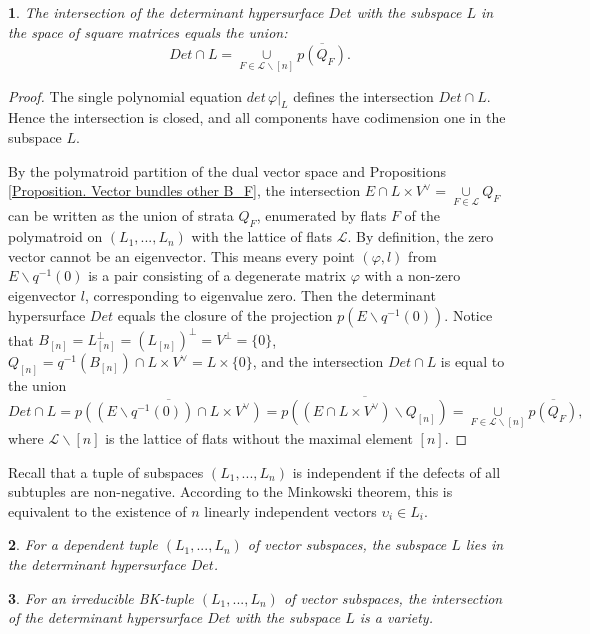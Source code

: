 \documentclass[11pt]{article}
\theoremstyle{plain}
\newtheorem{thm}{\protect\theoremname}[section]
\theoremstyle{definition}
\theoremstyle{remark}
\theoremstyle{plain}
\theoremstyle{plain}
\newtheorem{prop}[thm]{\protect\propositionname}
\theoremstyle{plain}
\newtheorem{cor}[thm]{\protect\corollaryname}
\theoremstyle{definition}
\providecommand{\corollaryname}{Corollary}
\providecommand{\propositionname}{Proposition}
\providecommand{\theoremname}{Theorem}
\begin{document}
\begin{prop}
The intersection of the determinant hypersurface $Det$ with the subspace
$L$ in the space of square matrices equals the union:
\[
Det\cap L=\underset{F\in\mathcal{L}\backslash[n]}{\cup}\overline{p(Q_{F})}.
\]
\end{prop}

\begin{proof}
The single polynomial equation $det\,\varphi|_{L}$ defines the intersection
$Det\cap L$. Hence the intersection is closed, and all components
have codimension one in the subspace $L$.

By the polymatroid partition of the dual vector space \cite{pokidkin_combinatorics_2025}
and Propositions \ref{Proposition. Vector bundles other B_F}, the
intersection $E\cap L\times V^{\lor}=\underset{F\in\mathcal{L}}{\cup}Q_{F}$
can be written as the union of strata $Q_{F}$, enumerated by flats
$F$ of the polymatroid on $(L_{1},...,L_{n})$ with the lattice of
flats $\mathcal{L}$. By definition, the zero vector cannot be an
eigenvector. This means every point $(\varphi,l)$ from $E\backslash q^{-1}(0)$
is a pair consisting of a degenerate matrix $\varphi$ with a non-zero
eigenvector $l$, corresponding to eigenvalue zero. Then the determinant
hypersurface $Det$ equals the closure of the projection $p(E\backslash q^{-1}(0))$.
Notice that $B_{[n]}=L_{[n]}^{\perp}=(L_{[n]})^{\perp}=V^{\perp}=\{0\}$,
$Q_{[n]}=q^{-1}(B_{[n]})\cap L\times V^{\lor}=L\times\{0\}$, and
the intersection $Det\cap L$ is equal to the union
\[
Det\cap L=\overline{p((E\backslash q^{-1}(0))\cap L\times V^{\lor})}=\overline{p((E\cap L\times V^{\lor})\backslash Q_{[n]})}=\underset{F\in\mathcal{L}\backslash[n]}{\cup}\overline{p(Q_{F})},
\]
where $\mathcal{L}\backslash[n]$ is the lattice of flats without
the maximal element $[n]$. 
\end{proof}
Recall that a tuple of subspaces $(L_{1},...,L_{n})$ is independent
if the defects of all subtuples are non-negative. According to the
Minkowski theorem, this is equivalent to the existence of $n$ linearly
independent vectors $\upsilon_{i}\in L_{i}$.
\begin{cor}
For a dependent tuple $(L_{1},...,L_{n})$ of vector subspaces, the
subspace $L$ lies in the determinant hypersurface $Det$.
\end{cor}

\begin{thm}
\label{Theorem. Intersection of the determinant with a subspace}For
an irreducible BK-tuple $(L_{1},...,L_{n})$ of vector subspaces,
the intersection of the determinant hypersurface $Det$ with the subspace
$L$ is a variety.
\end{thm}
\end{document}
